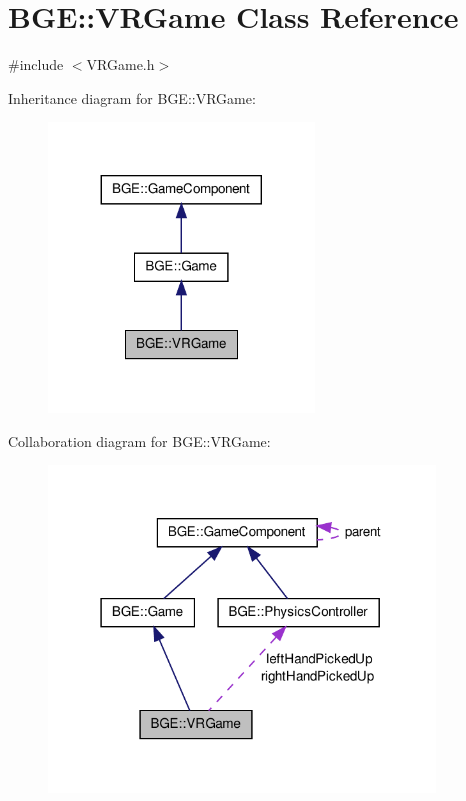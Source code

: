 \hypertarget{class_b_g_e_1_1_v_r_game}{\section{B\-G\-E\-:\-:V\-R\-Game Class Reference}
\label{class_b_g_e_1_1_v_r_game}
}


{\ttfamily \#include $<$V\-R\-Game.\-h$>$}



Inheritance diagram for B\-G\-E\-:\-:V\-R\-Game\-:
\nopagebreak
\begin{figure}[H]
\begin{center}
\leavevmode
\includegraphics[width=200pt]{class_b_g_e_1_1_v_r_game__inherit__graph}
\end{center}
\end{figure}


Collaboration diagram for B\-G\-E\-:\-:V\-R\-Game\-:
\nopagebreak
\begin{figure}[H]
\begin{center}
\leavevmode
\includegraphics[width=291pt]{class_b_g_e_1_1_v_r_game__coll__graph}
\end{center}
\end{figure}
